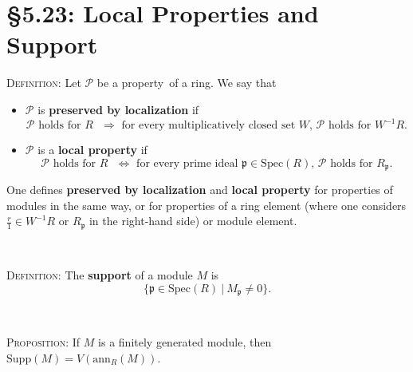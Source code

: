 \documentclass[12pt]{amsart}
\newcommand{\p}{\mathfrak{p}}
\newcommand{\ann}{\mathrm{ann}}
\newcommand{\Spec}{\mathrm{Spec}}
\renewcommand{\1}{\mathbbm{1}}
\newcommand{\showsol}[1]{\def\displaysol{#1}}
\begin{document}
\showsol{0}
	
	\thispagestyle{empty}
	
	\section*{\S5.23: Local Properties and Support}
	
	\begin{framed}
\noindent \textsc{Definition:} Let $\mathcal{P}$ be a property\footnotemark\ of a ring. We say that 
\begin{itemize}
\item $\mathcal{P}$ is \textbf{preserved by localization} if 
\[ \text{$\mathcal{P}$ holds for $R$ $\Longrightarrow$ for every multiplicatively closed set $W$, $\mathcal{P}$ holds for $W^{-1}R$}.\]
\item $\mathcal{P}$ is a \textbf{local property} if 
\[ \text{$\mathcal{P}$ holds for $R$ $\Longleftrightarrow$ for every prime ideal $\p\in \Spec(R)$, $\mathcal{P}$ holds for $R_\p$}.\]
\end{itemize}
One defines \textbf{preserved by localization} and \textbf{local property} for properties of modules in the same way, or for properties of a ring element (where one considers $\frac{r}{1}\in W^{-1}R$ or $R_{\p}$ in the right-hand side) or module element. 

\

\noindent \textsc{Definition:} The \textbf{support} of a module $M$ is
\[ \{ \p \in \Spec(R) \ | \ M_{\p} \neq 0\}.\]

\

\noindent \textsc{Proposition:} If $M$ is a finitely generated module, then $\mathrm{Supp}(M) = V(\ann_R(M))$.
\end{framed}

	
\end{document}
